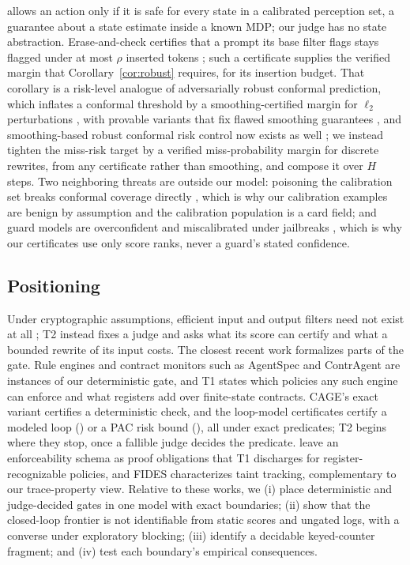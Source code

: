 allows an action only if it is safe for every state in a calibrated
perception set, a guarantee about a state estimate inside a known MDP; our
judge has no state abstraction. Erase-and-check certifies that a prompt its
base filter flags stays flagged under at most $\rho$ inserted tokens
\citep{kumar2024certifying}; such a certificate supplies the verified margin that
Corollary~\ref{cor:robust} requires, for its insertion budget. That corollary is a
risk-level analogue of adversarially robust conformal prediction, which inflates a
conformal threshold by a smoothing-certified margin for $\ell_2$ perturbations
\citep{gendler2022robustconformal}, with provable variants that fix flawed smoothing guarantees
\citep{yan2024provably}, and smoothing-based robust conformal risk control now exists
as well \citep{zargarbashi2025onesample}; we instead tighten the miss-risk target by a verified
miss-probability margin for discrete rewrites, from any certificate rather than smoothing, and
compose it over $H$ steps. Two neighboring threats are outside our model: poisoning the
calibration set breaks conformal coverage directly \citep{li2024data}, which is why our
calibration examples are benign by assumption and the calibration population is a card field;
and guard models are overconfident and miscalibrated under jailbreaks \citep{liu2025calibration},
which is why our certificates use only score ranks, never a guard's stated confidence.

\subsection{Positioning}
Under cryptographic assumptions, efficient input and output filters need not exist at all
\citep{ball2026impossibility}; T2 instead fixes a judge and asks what its score can certify
and what a bounded rewrite of its input costs.
The closest recent work formalizes parts of the gate. Rule engines and contract monitors such as
AgentSpec and ContrAgent are instances of our deterministic gate, and T1 states which policies
any such engine can enforce and what registers add over finite-state contracts. CAGE's exact variant certifies a deterministic check, and the loop-model certificates certify a
modeled loop (\citet{gu2026certified}) or a PAC risk bound (\citet{baheri2026controller}), all under
exact predicates; T2 begins where they stop, once a fallible judge decides the predicate. \citet{david2026alignment} leave an
enforceability schema as proof obligations that T1 discharges for register-recognizable
policies, and FIDES characterizes taint tracking, complementary to our trace-property view.
Relative to these works, we (i) place deterministic and judge-decided gates in one model with
exact boundaries; (ii) show that the closed-loop frontier is not identifiable from static scores
and ungated logs, with a converse under exploratory blocking; (iii) identify a decidable
keyed-counter fragment; and (iv) test each boundary's empirical consequences.


